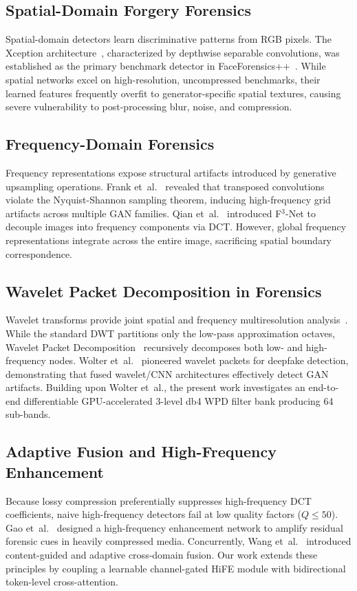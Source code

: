 \documentclass[11pt,a4paper]{article}
\begin{document}
\subsection{Spatial-Domain Forgery Forensics}
Spatial-domain detectors learn discriminative patterns from RGB pixels. The Xception architecture~\cite{chollet2017xception}, characterized by depthwise separable convolutions, was established as the primary benchmark detector in FaceForensics++~\cite{rossler2019faceforensics}. While spatial networks excel on high-resolution, uncompressed benchmarks, their learned features frequently overfit to generator-specific spatial textures, causing severe vulnerability to post-processing blur, noise, and compression.

\subsection{Frequency-Domain Forensics}
Frequency representations expose structural artifacts introduced by generative upsampling operations. Frank et~al.~\cite{frank2020leveraging} revealed that transposed convolutions violate the Nyquist-Shannon sampling theorem, inducing high-frequency grid artifacts across multiple GAN families. Qian et~al.~\cite{qian2020thinking} introduced F$^3$-Net to decouple images into frequency components via DCT. However, global frequency representations integrate across the entire image, sacrificing spatial boundary correspondence.

\subsection{Wavelet Packet Decomposition in Forensics}
Wavelet transforms provide joint spatial and frequency multiresolution analysis~\cite{mallat1989theory}. While the standard DWT partitions only the low-pass approximation octaves, Wavelet Packet Decomposition~\cite{coifman1992entropy} recursively decomposes both low- and high-frequency nodes. Wolter et~al.~\cite{wolter2022wavelet} pioneered wavelet packets for deepfake detection, demonstrating that fused wavelet/CNN architectures effectively detect GAN artifacts. Building upon Wolter et~al., the present work investigates an end-to-end differentiable GPU-accelerated 3-level db4 WPD filter bank producing 64 sub-bands.

\subsection{Adaptive Fusion and High-Frequency Enhancement}
Because lossy compression preferentially suppresses high-frequency DCT coefficients, naive high-frequency detectors fail at low quality factors ($Q \le 50$). Gao et~al.~\cite{gao2024deepfake} designed a high-frequency enhancement network to amplify residual forensic cues in heavily compressed media. Concurrently, Wang et~al.~\cite{wang2023dynamic,wang2024deepfake} introduced content-guided and adaptive cross-domain fusion. Our work extends these principles by coupling a learnable channel-gated HiFE module with bidirectional token-level cross-attention.
\end{document}
